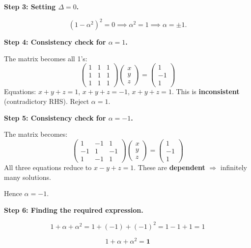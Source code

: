 \documentclass[12pt]{article}
\begin{document}
\textbf{Step 3: Setting $\Delta = 0$.}

\[
(1 - \alpha^2)^2 = 0 \implies \alpha^2 = 1 \implies \alpha = \pm 1.
\]

\textbf{Step 4: Consistency check for $\alpha = 1$.}

The matrix becomes all 1's:
\[
\begin{pmatrix}1&1&1\\1&1&1\\1&1&1\end{pmatrix}
\begin{pmatrix}x\\y\\z\end{pmatrix}
=\begin{pmatrix}1\\-1\\1\end{pmatrix}
\]
Equations: $x+y+z=1$, $x+y+z=-1$, $x+y+z=1$. This is \textbf{inconsistent} (contradictory RHS). Reject $\alpha = 1$.

\textbf{Step 5: Consistency check for $\alpha = -1$.}

The matrix becomes:
\[
\begin{pmatrix}1&-1&1\\-1&1&-1\\1&-1&1\end{pmatrix}
\begin{pmatrix}x\\y\\z\end{pmatrix}
=\begin{pmatrix}1\\-1\\1\end{pmatrix}
\]
All three equations reduce to $x - y + z = 1$. These are \textbf{dependent} $\Rightarrow$ infinitely many solutions. \checkmark

Hence $\alpha = -1$.

\textbf{Step 6: Finding the required expression.}

\[
1 + \alpha + \alpha^2 = 1 + (-1) + (-1)^2 = 1 - 1 + 1 = \boxed{1}
\]

\begin{answerbox}
\[1 + \alpha + \alpha^2 = \mathbf{1}\]
\end{answerbox}
\end{document}
